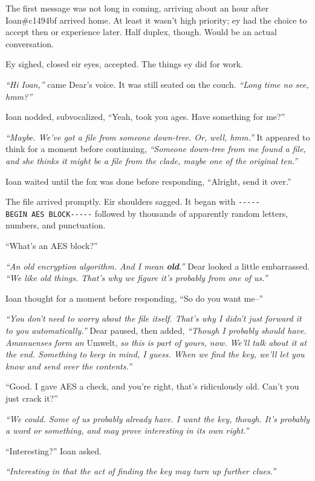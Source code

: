 The first message was not long in coming, arriving about an hour after Ioan\#c1494bf arrived home. At least it wasn't high priority; ey had the choice to accept then or experience later. Half duplex, though. Would be an actual conversation.

Ey sighed, closed eir eyes, accepted. The things ey did for work.

\emph{``Hi Ioan,''} came Dear's voice. It was still seated on the couch. \emph{``Long time no see, hmm?''}

Ioan nodded, subvocalized, ``Yeah, took you ages. Have something for me?''

\emph{``Maybe. We've got a file from someone down-tree. Or, well, hmm.''} It appeared to think for a moment before continuing, \emph{``Someone down-tree from me found a file, and she thinks it might be a file from the clade, maybe one of the original ten.''}

Ioan waited until the fox was done before responding, ``Alright, send it over.''

The file arrived promptly. Eir shoulders sagged. It began with \texttt{-\/-\/-\/-\/-BEGIN\ AES\ BLOCK-\/-\/-\/-\/-} followed by thousands of apparently random letters, numbers, and punctuation.

``What's an AES block?''

\emph{``An old encryption algorithm. And I mean \textbf{old}.''} Dear looked a little embarrassed. \emph{``We like old things. That's why we figure it's probably from one of us.''}

Ioan thought for a moment before responding, ``So do you want me--''

\emph{``You don't need to worry about the file itself. That's why I didn't just forward it to you automatically.''} Dear paused, then added, \emph{``Though I probably should have. Amanuenses form an} Umwelt, \emph{so this is part of yours, now. We'll talk about it at the end. Something to keep in mind, I guess. When we find the key, we'll let you know and send over the contents.''}

``Good. I gave AES a check, and you're right, that's ridiculously old. Can't you just crack it?''

\emph{``We could. Some of us probably already have. I want the key, though. It's probably a word or something, and may prove interesting in its own right.''}

``Interesting?'' Ioan asked.

\emph{``Interesting in that the act of finding the key may turn up further clues.''}

